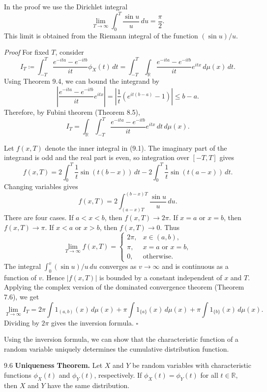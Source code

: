 In the proof we use the Dirichlet integral
\[
\lim_{T\to\infty}\int_0^T \frac{\sin u}{u}\,du=\frac{\pi}{2}.
\]
This limit is obtained from the Riemann integral of the function $(\sin u)/u$.

\textit{Proof}
For fixed $T$, consider
\[
I_T \coloneqq
\int_{-T}^{T}\frac{e^{-ita}-e^{-itb}}{it}\phi_X(t)\,dt
=\int_{-T}^{T}\int_{\mathbb{R}}
\frac{e^{-ita}-e^{-itb}}{it}e^{itx}\,d\mu(x)\,dt.
\]
Using Theorem 9.4, we can bound the integrand by
\[
\left\lvert
\frac{e^{-ita}-e^{-itb}}{it}e^{itx}
\right\rvert
=\left\lvert \frac{1}{t}(e^{it(b-a)}-1)\right\rvert
\leq b-a.
\]
Therefore, by Fubini theorem (Theorem 8.5),
\[
I_T=\int_{\mathbb{R}}\int_{-T}^{T}
\frac{e^{-ita}-e^{-itb}}{it}e^{itx}\,dt\,d\mu(x).
\tag{9.1}
\]

Let $f(x,T)$ denote the inner integral in (9.1). The imaginary part of the integrand is odd and the real part is even, so integration over $[-T,T]$ gives
\[
f(x,T)
=2\int_0^T \frac{1}{t}\sin(t(b-x))\,dt
-2\int_0^T \frac{1}{t}\sin(t(a-x))\,dt.
\]
Changing variables gives
\[
f(x,T)
=2\int_{(a-x)T}^{(b-x)T}\frac{\sin u}{u}\,du.
\]
There are four cases. If $a<x<b$, then $f(x,T)\to 2\pi$. If $x=a$ or $x=b$, then $f(x,T)\to \pi$. If $x<a$ or $x>b$, then $f(x,T)\to 0$. Thus
\[
\lim_{T\to\infty} f(x,T)=
\begin{cases}
2\pi, & x\in(a,b),\\
\pi, & x=a\text{ or }x=b,\\
0, & \text{otherwise}.
\end{cases}
\]
The integral $\int_0^v (\sin u)/u\,du$ converges as $v\to\infty$ and is continuous as a function of $v$. Hence $\lvert f(x,T)\rvert$ is bounded by a constant independent of $x$ and $T$. Applying the complex version of the dominated convergence theorem (Theorem 7.6), we get
\[
\lim_{T\to\infty} I_T
=2\pi\int 1_{(a,b)}(x)\,d\mu(x)
+\pi\int 1_{\{a\}}(x)\,d\mu(x)
+\pi\int 1_{\{b\}}(x)\,d\mu(x).
\]
Dividing by $2\pi$ gives the inversion formula.
\hfill $\square$

Using the inversion formula, we can show that the characteristic function of a random variable uniquely determines the cumulative distribution function.

\begin{thmbox}{9.6}
\textbf{Uniqueness Theorem.}
Let $X$ and $Y$ be random variables with characteristic functions $\phi_X(t)$ and $\phi_Y(t)$, respectively. If $\phi_X(t)=\phi_Y(t)$ for all $t\in\mathbb{R}$, then $X$ and $Y$ have the same distribution.
\end{thmbox}

